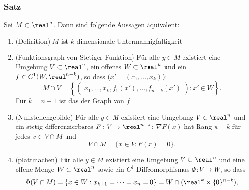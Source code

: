 \documentclass[
 a4paper,
 12pt,
 parskip=half
 ]{scrartcl}
\theoremstyle{plain}
\theoremstyle{definition}
\numberwithin{equation}{section}
\begin{document}
\subsubsection{Satz}
\begin{thm}
 Sei $M \subset \real^n$. Dann sind folgende Aussagen äquivalent:
 \begin{enumerate}
  \item (Definition) $M$ ist $k$-dimensionale Untermannigfaltigkeit.
  \item (Funktionsgraph von Stetiger Funktion) Für alle $y \in M$ existiert eine Umgebung $V \subset \real^n$, ein offenes $W \subset \real^k$ und ein $f \in C^1(W, \real^{n-k})$, so dass ($x' = (x_1, \ldots, x_k)$):
  \[ M \cap V = \left\{ \begin{pmatrix}x_1, \ldots, x_k, f_1(x'), \ldots, f_{n-k}(x') \end{pmatrix} : x' \in W \right\}. \]
  Für $k = n-1$ ist das der Graph von $f$
  \item (Nullstellengebilde) Für alle $y \in M$ existiert eine Umgebung $V \in \real^n$ und ein stetig differenzierbares $F:V \to \real^{n-k}$; $\nabla F(x)$ hat Rang $n-k$ für jedes $x \in V \cap M$ und
  \[ V \cap M = \{ x \in V : F(x) = 0 \}. \]
  \item (plattmachen) Für alle $y \in M$ existiert eine Umgebung $V \subset \real^n$ und eine offene Menge $W \subset \real^n$ sowie ein $C^1$-Diffeomorphismus $\Phi\colon V \to W$, so dass
  \[ \Phi(V \cap M) = \{ x \in W : x_{k+1} = \cdots = x_n = 0 \} = W \cap (\real^k \times \{ 0 \}^{n-k}), \]
 \end{enumerate}
\end{thm}
\end{document}
